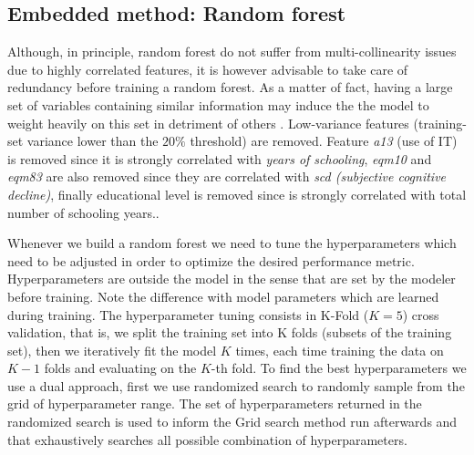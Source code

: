 \documentclass[preprint,12pt]{elsarticle}
\begin{document}
\subsection{Embedded method: Random forest}

Although, in principle, random forest do not suffer from multi-collinearity issues due to highly correlated features, it is however advisable to take care of redundancy before training a random forest. As a matter of fact, having a large set of variables containing similar information may induce the the model to weight heavily on this set in detriment of others \cite{strobl2007bias}. 
Low-variance features (training-set variance lower than the $20\%$ threshold) are removed. Feature \emph{a13} (use of IT) is removed since it is strongly correlated with \emph{years of schooling}, \emph{eqm10} and \emph{eqm83} are also removed since they are correlated with \emph{scd (subjective cognitive decline)}, finally educational level is removed since is strongly correlated with total number of schooling years.. 

Whenever we build a random forest we need to tune the hyperparameters which need to be    adjusted in order to optimize the desired performance metric. Hyperparameters are outside the model in the sense that are set by the modeler before training. Note the difference with model parameters which are learned during training. The hyperparameter tuning consists in  K-Fold ($K=5$) cross validation, that is, we split the training set into K folds (subsets of the training set), then we iteratively fit the model $K$ times, each time training the data on $K-1$ folds and evaluating on the $K$-th fold. 
To find the best hyperparameters we use a dual approach, first we use randomized search to randomly sample from the grid of hyperparameter range. The set of hyperparameters returned in the randomized search is used to inform the Grid search method run afterwards and that  exhaustively searches all possible combination of hyperparameters.
\end{document}
